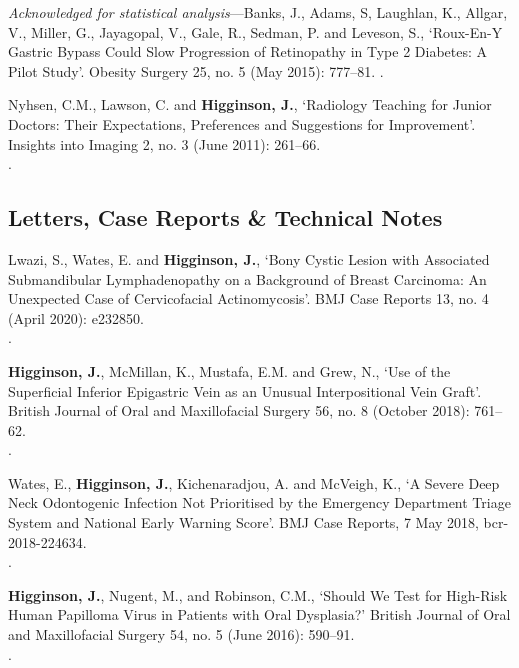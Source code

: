  \textit{Acknowledged for statistical analysis}---Banks, J., Adams, S, Laughlan, K., Allgar, V., Miller, G., Jayagopal, V., Gale, R., Sedman, P. and Leveson, S., `Roux-En-Y Gastric Bypass Could Slow Progression of Retinopathy in Type 2 Diabetes: A Pilot Study’. Obesity Surgery 25, no. 5 (May 2015): 777–81. .

\vspace{0.1cm}

 Nyhsen, C.M., Lawson, C. and \textbf{Higginson, J.}, `Radiology Teaching for Junior Doctors: Their Expectations, Preferences and Suggestions for Improvement’. Insights into Imaging 2, no. 3 (June 2011): 261–66. 
\\.



\subsection*{Letters, Case Reports \& Technical Notes}

 Lwazi, S., Wates, E. and \textbf{Higginson, J.}, `Bony Cystic Lesion with Associated Submandibular Lymphadenopathy on a Background of Breast Carcinoma: An Unexpected Case of Cervicofacial Actinomycosis’. BMJ Case Reports 13, no. 4 (April 2020): e232850. 
\\.

\vspace{0.1cm}

 \textbf{Higginson, J.}, McMillan, K., Mustafa, E.M.  and Grew, N., `Use of the Superficial Inferior Epigastric Vein as an Unusual Interpositional Vein Graft’. British Journal of Oral and Maxillofacial Surgery 56, no. 8 (October 2018): 761–62. 
\\.

\vspace{0.1cm}

 Wates, E., \textbf{Higginson, J.}, Kichenaradjou, A. and McVeigh, K., `A Severe Deep Neck Odontogenic Infection Not Prioritised by the Emergency Department Triage System and National Early Warning Score’. BMJ Case Reports, 7 May 2018, bcr-2018-224634. 
\\.

\vspace{0.1cm}

 \textbf{Higginson, J.}, Nugent, M., and Robinson, C.M., `Should We Test for High-Risk Human Papilloma Virus in Patients with Oral Dysplasia?’ British Journal of Oral and Maxillofacial Surgery 54, no. 5 (June 2016): 590–91. 
\\.



